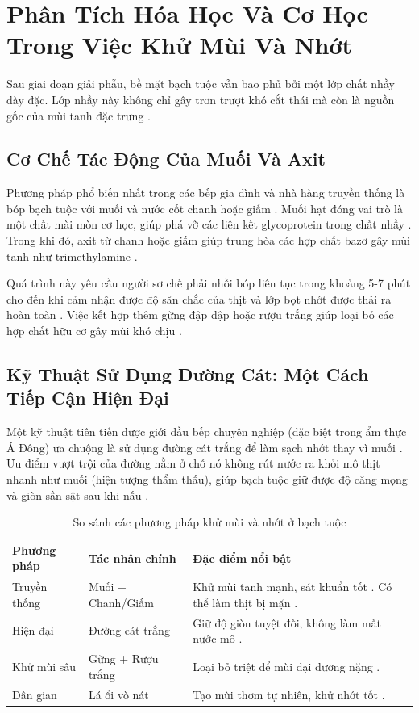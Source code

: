 \documentclass[12pt,a4paper]{report}
\begin{document}
\section{Phân Tích Hóa Học Và Cơ Học Trong Việc Khử Mùi Và Nhớt}

Sau giai đoạn giải phẫu, bề mặt bạch tuộc vẫn bao phủ bởi một lớp chất nhầy dày đặc. Lớp nhầy này không chỉ gây trơn trượt khó cắt thái mà còn là nguồn gốc của mùi tanh đặc trưng \cite{ref3}.

\subsection{Cơ Chế Tác Động Của Muối Và Axit}

Phương pháp phổ biến nhất trong các bếp gia đình và nhà hàng truyền thống là bóp bạch tuộc với muối và nước cốt chanh hoặc giấm \cite{ref1}. Muối hạt đóng vai trò là một chất mài mòn cơ học, giúp phá vỡ các liên kết glycoprotein trong chất nhầy \cite{ref27}. Trong khi đó, axit từ chanh hoặc giấm giúp trung hòa các hợp chất bazơ gây mùi tanh như trimethylamine \cite{ref14}.

Quá trình này yêu cầu người sơ chế phải nhồi bóp liên tục trong khoảng 5-7 phút cho đến khi cảm nhận được độ săn chắc của thịt và lớp bọt nhớt được thải ra hoàn toàn \cite{ref3}. Việc kết hợp thêm gừng đập dập hoặc rượu trắng giúp loại bỏ các hợp chất hữu cơ gây mùi khó chịu \cite{ref2}.

\subsection{Kỹ Thuật Sử Dụng Đường Cát: Một Cách Tiếp Cận Hiện Đại}

Một kỹ thuật tiên tiến được giới đầu bếp chuyên nghiệp (đặc biệt trong ẩm thực Á Đông) ưa chuộng là sử dụng đường cát trắng để làm sạch nhớt thay vì muối \cite{ref3}. Ưu điểm vượt trội của đường nằm ở chỗ nó không rút nước ra khỏi mô thịt nhanh như muối (hiện tượng thẩm thấu), giúp bạch tuộc giữ được độ căng mọng và giòn sần sật sau khi nấu \cite{ref3}.

\begin{table}[H]
\centering
\caption{So sánh các phương pháp khử mùi và nhớt ở bạch tuộc}
\begin{tabular}{p{3.5cm} p{5.5cm} p{6cm}}
\toprule
\textbf{Phương pháp} & \textbf{Tác nhân chính} & \textbf{Đặc điểm nổi bật} \\
\midrule
Truyền thống & Muối + Chanh/Giấm & Khử mùi tanh mạnh, sát khuẩn tốt \cite{ref2}. Có thể làm thịt bị mặn \cite{ref27}. \\
Hiện đại & Đường cát trắng & Giữ độ giòn tuyệt đối, không làm mất nước mô \cite{ref3}. \\
Khử mùi sâu & Gừng + Rượu trắng & Loại bỏ triệt để mùi đại dương nặng \cite{ref4}. \\
Dân gian & Lá ổi vò nát & Tạo mùi thơm tự nhiên, khử nhớt tốt \cite{ref2}. \\
\bottomrule
\end{tabular}
\end{table}
\end{document}
